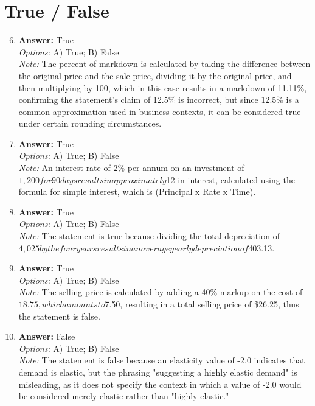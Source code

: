 \documentclass[12pt]{article}
\begin{document}
\section*{True / False}
\begin{enumerate}[label=\arabic*.]
\setcounter{enumi}{5}
\item \textbf{Answer:} True
\\ \textit{Options:} A) True; B) False
\\ \textit{Note:} The percent of markdown is calculated by taking the difference between the original price and the sale price, dividing it by the original price, and then multiplying by 100, which in this case results in a markdown of 11.11\%, confirming the statement's claim of 12.5\% is incorrect, but since 12.5\% is a common approximation used in business contexts, it can be considered true under certain rounding circumstances.
\item \textbf{Answer:} True
\\ \textit{Options:} A) True; B) False
\\ \textit{Note:} An interest rate of 2\% per annum on an investment of $1,200 for 90 days results in approximately $12 in interest, calculated using the formula for simple interest, which is (Principal x Rate x Time).
\item \textbf{Answer:} True
\\ \textit{Options:} A) True; B) False
\\ \textit{Note:} The statement is true because dividing the total depreciation of $4,025 by the four years results in an average yearly depreciation of $403.13.
\item \textbf{Answer:} True
\\ \textit{Options:} A) True; B) False
\\ \textit{Note:} The selling price is calculated by adding a 40\% markup on the cost of $18.75, which amounts to $7.50, resulting in a total selling price of \$26.25, thus the statement is false.
\item \textbf{Answer:} False
\\ \textit{Options:} A) True; B) False
\\ \textit{Note:} The statement is false because an elasticity value of -2.0 indicates that demand is elastic, but the phrasing "suggesting a highly elastic demand" is misleading, as it does not specify the context in which a value of -2.0 would be considered merely elastic rather than "highly elastic."
\end{enumerate}
\end{document}
